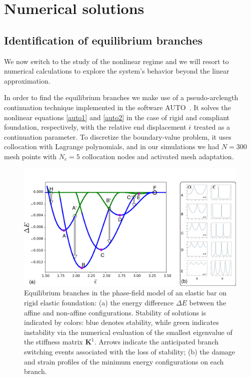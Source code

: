 
\section{Numerical solutions}
\label{sec:numerics}
\subsection{Identification of equilibrium branches}

We now switch to the study of  the nonlinear regime  and we will resort to numerical calculations  to explore the system's behavior beyond the linear approximation.

In order to find the equilibrium branches we make use of a pseudo-arclength continuation technique implemented in the software AUTO~\cite{Doedel1981-sa}. It solves the nonlinear equations \ref{auto1} and \ref{auto2} in the case of rigid and compliant foundation, respectively, with the relative end displacement $\bar\epsilon$ treated as a continuation parameter. To discretize the boundary-value problem, it uses collocation with Lagrange polynomials, and in our simulations we had $N=300$ mesh points with $N_c = 5$ collocation nodes and activated mesh adaptation. 
\begin{figure}
\includegraphics[scale=0.1]{./final_images/fig2.pdf}
    \caption{
Equilibrium branches in the phase-field model of an elastic bar on rigid elastic foundation: (a) the energy difference $\Delta E$ between the affine and non-affine configurations. Stability of solutions is indicated by colors: blue denotes stability, while green indicates instability   via the numerical evaluation of the smallest eigenvalue of the stiffness matrix $\mathbf{K}^1$. Arrows indicate the anticipated branch switching events associated with the loss of stability; (b) the damage and strain profiles of the minimum energy configurations on each branch.}
    \label{fig:branches-stiff}
\end{figure}
